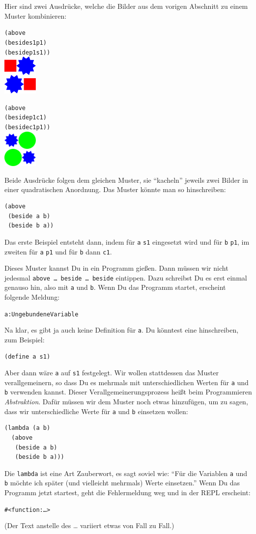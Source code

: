 Hier sind zwei Ausdrücke, welche die Bilder aus dem vorigen Abschnitt
zu einem Muster kombinieren:
%
\begin{alltt}
(above
 (beside s1 p1)
 (beside p1 s1))
\evalsto{} \includegraphics[width=48pt]{i1prog/tile1}

(above
 (beside p1 c1)
 (beside c1 p1))
\evalsto{} \includegraphics[width=48pt]{i1prog/tile2}
\end{alltt}
%
Beide Ausdrücke folgen dem gleichen Muster, sie "`kacheln"' jeweils zwei
Bilder in einer quadratischen Anordnung.  Das Muster könnte man so
hinschreiben:
%
\begin{verbatim}
(above
 (beside a b)
 (beside b a))
\end{verbatim}
%
Das erste Beispiel entsteht dann, indem für \texttt{a} \texttt{s1}
eingesetzt wird und für \texttt{b} \texttt{p1}, im zweiten für \texttt{a}
\texttt{p1} und für \texttt{b} dann \texttt{c1}.

Dieses Muster kannst Du in ein Programm gießen.  Dann müssen wir nicht
jedesmal \texttt{above \ldots{} beside \ldots{} beside} eintippen.
Dazu schreibst Du es erst einmal genauso hin, also mit \texttt{a} und
\texttt{b}.  Wenn Du das Programm startet, erscheint folgende Meldung:
%
\begin{alltt}
\color{red}a: Ungebundene Variable
\end{alltt}
%
Na klar, es gibt ja auch keine Definition für \texttt{a}.  Du könntest
eine hinschreiben, zum Beispiel:
%
\begin{verbatim}
(define a s1)
\end{verbatim}
%
Aber dann wäre \texttt{a} auf \texttt{s1} festgelegt.  Wir wollen
stattdessen das Muster verallgemeinern, so dass Du es mehrmals mit
unterschiedlichen Werten für \texttt{a} und \texttt{b} verwenden
kannst.  Dieser Verallgemeinerungsprozess heißt beim Programmieren
\textit{Abstraktion}.  Dafür müssen wir dem Muster
noch etwas hinzufügen, um zu sagen, dass wir unterschiedliche Werte
für \texttt{a} und \texttt{b} einsetzen wollen:
%
\begin{verbatim}
(lambda (a b)
  (above
   (beside a b)
   (beside b a)))
\end{verbatim}
%
Die \texttt{lambda} ist eine Art Zauberwort, es sagt soviel wie: "`Für
die Variablen \texttt{a} und \texttt{b} möchte ich später (und
vielleicht mehrmals) Werte einsetzen."'  Wenn Du das Programm jetzt
startest, geht die Fehlermeldung weg und in der REPL erscheint:
%
\begin{alltt}
#<function:\ldots>
\end{alltt}
%
(Der Text anstelle des \ldots{} variiert etwas von Fall zu Fall.)

